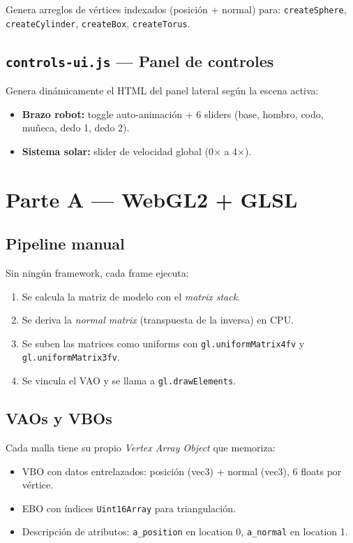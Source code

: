 \documentclass[12pt,a4paper]{article}
\begin{document}
Genera arreglos de vértices indexados (posición + normal) para:
\texttt{createSphere}, \texttt{createCylinder}, \texttt{createBox}, \texttt{createTorus}.

\subsection{\texttt{controls-ui.js} — Panel de controles}

Genera dinámicamente el HTML del panel lateral según la escena activa:
\begin{itemize}[leftmargin=*]
  \item \textbf{Brazo robot:} toggle auto-animación + 6 sliders (base, hombro, codo, muñeca, dedo 1, dedo 2).
  \item \textbf{Sistema solar:} slider de velocidad global (0× a 4×).
\end{itemize}

\section{Parte A — WebGL2 + GLSL}

\subsection{Pipeline manual}

Sin ningún framework, cada frame ejecuta:

\begin{enumerate}[leftmargin=*]
  \item Se calcula la matriz de modelo con el \textit{matrix stack}.
  \item Se deriva la \textit{normal matrix} (transpuesta de la inversa) en CPU.
  \item Se suben las matrices como uniforms con \texttt{gl.uniformMatrix4fv} y \texttt{gl.uniformMatrix3fv}.
  \item Se vincula el VAO y se llama a \texttt{gl.drawElements}.
\end{enumerate}

\subsection{VAOs y VBOs}

Cada malla tiene su propio \textit{Vertex Array Object} que memoriza:
\begin{itemize}[leftmargin=*]
  \item VBO con datos entrelazados: posición (vec3) + normal (vec3), 6 floats por vértice.
  \item EBO con índices \texttt{Uint16Array} para triangulación.
  \item Descripción de atributos: \texttt{a\_position} en location 0, \texttt{a\_normal} en location 1.
\end{itemize}
\end{document}
